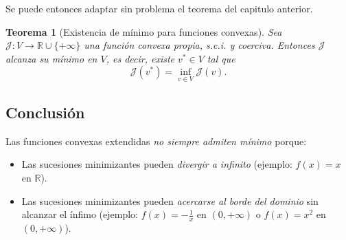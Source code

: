 \documentclass[12pt]{book}
\newtheorem{theorem}{Teorema}
\newtheorem{ex}{Ejemplo}
\newcommand{\dom}{\operatorname{dom}}
\theoremstyle{definition}
\theoremstyle{plain}
\theoremstyle{remark}
\begin{document}
Se puede entonces adaptar sin problema el teorema del capitulo anterior. 

\begin{theorem}[Existencia de mínimo para funciones convexas]
    Sea $\mathcal{J}: V \to {\mathbb{R}} \cup \{ +\infty\}$ una función convexa propia, s.c.i. y coerciva. Entonces $\mathcal{J}$ alcanza su mínimo en $V$, es decir, existe $v^* \in V$ tal que
    \[
    \mathcal{J}(v^*) = \inf_{v \in V} \mathcal{J}(v).
    \]
\end{theorem}



\subsection{Conclusión}

Las funciones convexas extendidas \emph{no siempre admiten mínimo} porque:
\begin{itemize}
    \item Las sucesiones minimizantes pueden \emph{divergir a infinito} (ejemplo: $f(x) = x$ en $\mathbb{R}$).
    \item Las sucesiones minimizantes pueden \emph{acercarse al borde del dominio} sin alcanzar el ínfimo (ejemplo: $f(x) = -\frac{1}{x}$ en $(0, +\infty)$ o $f(x) = x^2$ en $(0, +\infty)$).
\end{itemize}
\end{document}
